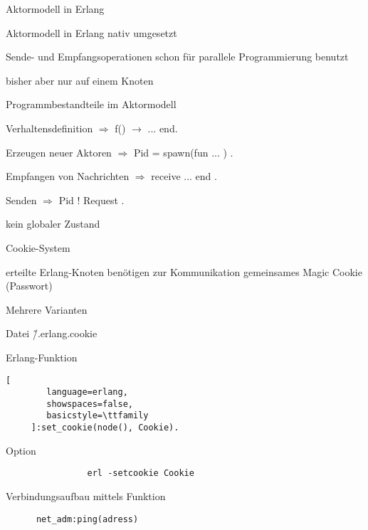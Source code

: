 \documentclass[10pt]{article}
\begin{document}
Aktormodell in Erlang
\begin{itemize*}
  \item Aktormodell in Erlang nativ umgesetzt
  \begin{itemize*}
    \item Sende- und Empfangsoperationen schon für parallele Programmierung benutzt
    \item bisher aber nur auf einem Knoten
  \end{itemize*}
  \item Programmbestandteile im Aktormodell
  \begin{itemize*}
    \item Verhaltensdefinition $\Rightarrow$ f() $\rightarrow$ ... end.
    \item Erzeugen neuer Aktoren $\Rightarrow$ Pid = spawn(fun ... ) .
    \item Empfangen von Nachrichten $\Rightarrow$ receive ... end .
    \item Senden $\Rightarrow$ Pid ! Request .
  \end{itemize*}
  \item kein globaler Zustand
\end{itemize*}

Cookie-System
\begin{itemize*}
  \item erteilte Erlang-Knoten benötigen zur Kommunikation gemeinsames Magic Cookie (Passwort)
  \item Mehrere Varianten
  \begin{itemize*}
    \item Datei \~/.erlang.cookie
    \item Erlang-Funktion
    \begin{lstlisting}[
        language=erlang,
        showspaces=false,
        basicstyle=\ttfamily
     ]:set_cookie(node(), Cookie).
    \end{lstlisting}
    \item Option
    \begin{lstlisting}
                erl -setcookie Cookie
              \end{lstlisting}
  \end{itemize*}
  \item Verbindungsaufbau mittels Funktion
  \begin{lstlisting}
      net_adm:ping(adress)
    \end{lstlisting}
\end{itemize*}
\end{document}
